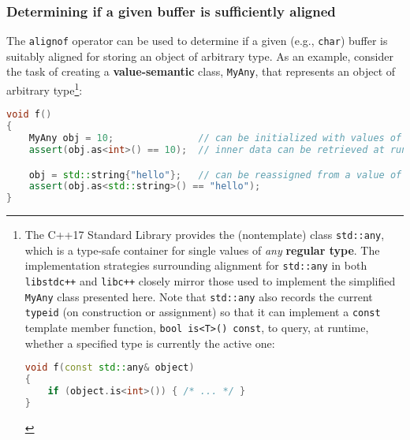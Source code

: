 \subsubsection[Determining if a given buffer is sufficiently aligned]{Determining if a given buffer is sufficiently aligned}\label{determining-if-a-given-buffer-is-sufficiently-aligned}

The \texttt{alignof} operator can be used to determine if a given (e.g.,
\texttt{char}) buffer is suitably aligned for storing an object of
arbitrary type. As an example, consider the task of creating a
\textbf{value-semantic} class, \texttt{MyAny}, that represents an object
of arbitrary type{\cprotect\footnote{The C++17 Standard Library provides
the (nontemplate) class \texttt{std::any}, which is a type-safe
container for single values of \emph{any} \textbf{regular type}. The
implementation strategies surrounding alignment for \texttt{std::any}
in both \texttt{libstdc++} and \texttt{libc++} closely mirror those
used to implement the simplified \texttt{MyAny} class presented here.
Note that \texttt{std::any} also records the current \texttt{typeid}
(on construction or assignment) so that it can implement a
\texttt{const} template member function,
\texttt{bool}~\texttt{is<T>()}~\texttt{const}, to query, at runtime,
whether a specified type is currently the active one:

\begin{lstlisting}[language=C++, basicstyle={\ttfamily\footnotesize}]
void f(const std::any& object)
{
    if (object.is<int>()) { /* ... */ }
}
\end{lstlisting}
      }}:

\begin{lstlisting}[language=C++]
void f()
{
    MyAny obj = 10;               // can be initialized with values of any type
    assert(obj.as<int>() == 10);  // inner data can be retrieved at runtime

    obj = std::string{"hello"};   // can be reassigned from a value of any type
    assert(obj.as<std::string>() == "hello");
}
\end{lstlisting}

